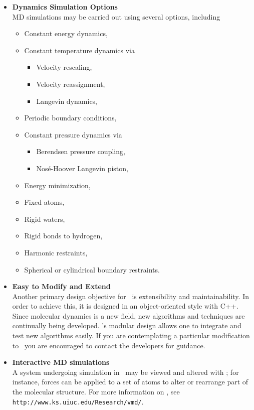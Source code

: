 \begin{itemize}
\item{\bf Dynamics Simulation Options}\\
MD simulations may be carried out using several options, including
\begin{itemize}
  \item Constant energy dynamics,
  \item Constant temperature dynamics via
  \begin{itemize}
    \item Velocity rescaling,
    \item Velocity reassignment,
    \item Langevin dynamics,
  \end{itemize}
  \item Periodic boundary conditions,
  \item Constant pressure dynamics via
  \begin{itemize}
    \item Berendsen pressure coupling,
    \item Nos\'{e}-Hoover Langevin piston,
  \end{itemize}
  \item Energy minimization,
  \item Fixed atoms,
  \item Rigid waters,
  \item Rigid bonds to hydrogen,
  \item Harmonic restraints,
  \item Spherical or cylindrical boundary restraints.
\end{itemize}

\item{\bf Easy to Modify and Extend}\\
Another primary design objective for \NAMD\ is extensibility and 
maintainability. In order to achieve this, it is designed in an 
object-oriented style with C++. Since molecular dynamics is a new field,
new algorithms and techniques are continually being developed.
\NAMD's modular design allows one to integrate and test new algorithms 
easily.  If you are contemplating a particular modification to \NAMD\
you are encouraged to contact the developers for guidance.

\item{\bf Interactive MD simulations}\\
A system undergoing simulation in \NAMD\ may be viewed and
altered with \VMD; for instance, forces can be applied to a set of atoms
to alter or rearrange part of the molecular structure.  For more information
on \VMD, see {\tt http://www.ks.uiuc.edu/Research/vmd/}.  


\end{itemize}
